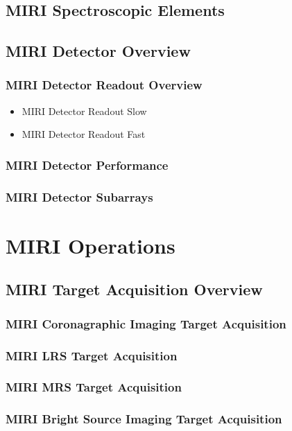     \subsection{MIRI Spectroscopic Elements}
    \subsection{MIRI Detector Overview}
        \subsubsection{MIRI Detector Readout Overview}
          \begin{itemize}
            \item{MIRI Detector Readout Slow}
            \item{MIRI Detector Readout Fast}
          \end{itemize}
         \subsubsection{MIRI Detector Performance}
         \subsubsection{MIRI Detector Subarrays}


\section{MIRI Operations}
\subsection{MIRI Target Acquisition Overview}
\subsubsection{MIRI Coronagraphic Imaging Target Acquisition}
\subsubsection{MIRI LRS Target Acquisition}
\subsubsection{MIRI MRS Target Acquisition}
\subsubsection{MIRI Bright Source Imaging Target Acquisition}

